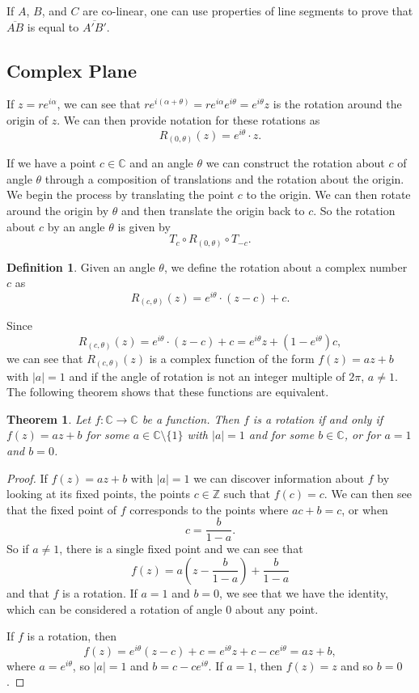 \documentclass[
]{book}
\newtheorem{theorem}{Theorem}[chapter]
\theoremstyle{definition}
\newtheorem{definition}{Definition}[chapter]
\theoremstyle{definition}
\theoremstyle{definition}
\theoremstyle{definition}
\theoremstyle{remark}
\begin{document}
If \(A\), \(B\), and \(C\) are co-linear, one can use properties of line segments to prove that \(\overline{AB}\) is equal to \(\overline{A'B'}\).

\hypertarget{complex-plane-2}{%
\subsection{Complex Plane}\label{complex-plane-2}}

If \(z=re^{i\alpha}\), we can see that \(re^{i(\alpha+\theta)}= r e^{i\alpha} e^{i\theta} = e^{i\theta} z\) is the rotation around the origin of \(z\). We can then provide notation for these rotations as
\[R_{(0,\theta)}(z) = e^{i\theta} \cdot z.\]

If we have a point \(c\in \mathbb{C}\) and an angle \(\theta\) we can construct the rotation about \(c\) of angle \(\theta\) through a composition of translations and the rotation about the origin. We begin the process by translating the point \(c\) to the origin. We can then rotate around the origin by \(\theta\) and then translate the origin back to \(c\). So the rotation about \(c\) by an angle \(\theta\) is given by \[T_c \circ R_{(0,\theta)} \circ T_{-c}.\]

\begin{definition}
Given an angle \(\theta\), we define the rotation about a complex number \(c\) as \[R_{(c,\theta)}(z) = e^{i\theta} \cdot (z-c)+c.\]
\end{definition}

Since \[R_{(c,\theta)}(z) = e^{i\theta} \cdot (z-c)+c = e^{i \theta} z + \left(1-e^{i\theta}\right)c,\] we can see that \(R_{(c,\theta)}(z)\) is a complex function of the form \(f(z)=az+b\) with \(|a|=1\) and if the angle of rotation is not an integer multiple of \(2\pi\), \(a\neq 1\). The following theorem shows that these functions are equivalent.

\begin{theorem}
Let \(f:\mathbb{C}\rightarrow \mathbb{C}\) be a function. Then \(f\) is a rotation if and only if \(f(z)=az+b\) for some \(a\in \mathbb{C}\setminus \{1\}\) with \(|a|=1\) and for some \(b\in \mathbb{C}\), or for \(a=1\) and \(b=0\).
\end{theorem}

\begin{proof}
If \(f(z)=az+b\) with \(|a|=1\) we can discover information about \(f\) by looking at its fixed points, the points \(c\in \mathbb{Z}\) such that \(f(c)=c\). We can then see that the fixed point of \(f\) corresponds to the points where \(ac+b=c\), or when \[c= \frac{b}{1-a}.\] So if \(a\neq 1\), there is a single fixed point and we can see that \[f(z)= a \left( z-\frac{b}{1-a}\right) + \frac{b}{1-a}\] and that \(f\) is a rotation. If \(a=1\) and \(b=0\), we see that we have the identity, which can be considered a rotation of angle \(0\) about any point.

If \(f\) is a rotation, then \[f(z) = e^{i\theta} (z-c)+c = e^{i\theta} z + c-ce^{i\theta} = az+b,\] where \(a=e^{i\theta}\), so \(|a|=1\) and \(b= c-ce^{i\theta}\). If \(a=1\), then \(f(z)=z\) and so \(b=0\).
\end{proof}
\end{document}
